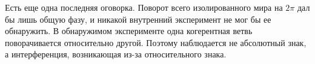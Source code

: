 \begin{classroomqa}
\end{classroomqa}

Есть еще одна последняя оговорка. Поворот всего изолированного мира на \(2\pi\) дал бы лишь общую фазу, и никакой внутренний эксперимент не мог бы ее обнаружить. В обнаружимом эксперименте одна когерентная ветвь поворачивается относительно другой. Поэтому наблюдается не абсолютный знак, а интерференция, возникающая из-за относительного знака.
